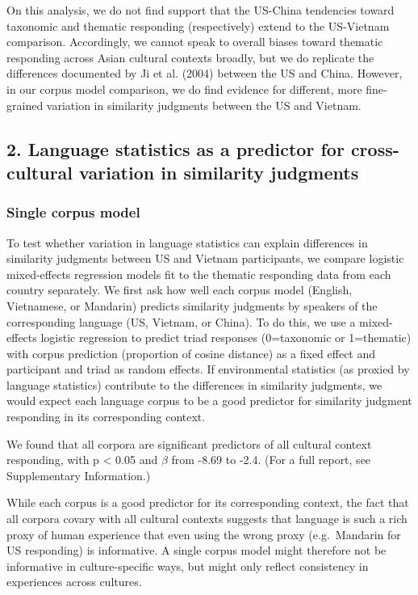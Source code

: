 \documentclass[10pt, letterpaper]{article}
\begin{document}
On this analysis, we do not find support that the US-China tendencies
toward taxonomic and thematic responding (respectively) extend to the
US-Vietnam comparison. Accordingly, we cannot speak to overall biases
toward thematic responding across Asian cultural contexts broadly, but
we do replicate the differences documented by Ji et al. (2004) between
the US and China. However, in our corpus model comparison, we do find
evidence for different, more fine-grained variation in similarity
judgments between the US and Vietnam.

\hypertarget{language-statistics-as-a-predictor-for-cross-cultural-variation-in-similarity-judgments}{%
\subsection{2. Language statistics as a predictor for cross-cultural
variation in similarity
judgments}\label{language-statistics-as-a-predictor-for-cross-cultural-variation-in-similarity-judgments}}

\hypertarget{single-corpus-model}{%
\subsubsection{Single corpus model}\label{single-corpus-model}}

To test whether variation in language statistics can explain differences
in similarity judgments between US and Vietnam participants, we compare
logistic mixed-effects regression models fit to the thematic responding
data from each country separately. We first ask how well each corpus
model (English, Vietnamese, or Mandarin) predicts similarity judgments
by speakers of the corresponding language (US, Vietnam, or China). To do
this, we use a mixed-effects logistic regression to predict triad
responses (0=taxonomic or 1=thematic) with corpus prediction (proportion
of cosine distance) as a fixed effect and participant and triad as
random effects. If environmental statistics (as proxied by language
statistics) contribute to the differences in similarity judgments, we
would expect each language corpus to be a good predictor for similarity
judgment responding in its corresponding context.

We found that all corpora are significant predictors of all cultural
context responding, with p \textless{} 0.05 and \(\beta\) from -8.69 to
-2.4. (For a full report, see Supplementary Information.)

While each corpus is a good predictor for its corresponding context, the
fact that all corpora covary with all cultural contexts suggests that
language is such a rich proxy of human experience that even using the
wrong proxy (e.g.~Mandarin for US responding) is informative. A single
corpus model might therefore not be informative in culture-specific
ways, but might only reflect consistency in experiences across cultures.
\end{document}
